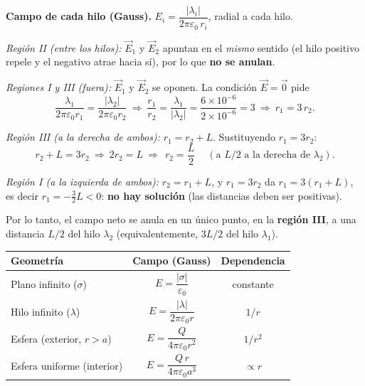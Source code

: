 \documentclass[12pt,letterpaper]{article}
\newcommand{\secgap}{\vspace{0.55cm}}
\begin{document}
\secgap

\noindent\textbf{Campo de cada hilo (Gauss).} $E_i=\dfrac{|\lambda_i|}{2\pi\varepsilon_0\,r_i}$, radial a cada hilo.

\smallskip
\noindent\emph{Regi\'on II (entre los hilos):} $\vec E_1$ y $\vec E_2$ apuntan en el \emph{mismo} sentido
(el hilo positivo repele y el negativo atrae hacia s\'i), por lo que \textbf{no se anulan}.

\smallskip
\noindent\emph{Regiones I y III (fuera):} $\vec E_1$ y $\vec E_2$ se oponen. La condici\'on $\vec E=\vec 0$ pide
\[
    \frac{\lambda_1}{2\pi\varepsilon_0 r_1}=\frac{|\lambda_2|}{2\pi\varepsilon_0 r_2}
    \ \Longrightarrow\
    \frac{r_1}{r_2}=\frac{\lambda_1}{|\lambda_2|}=\frac{6\times10^{-6}}{2\times10^{-6}}=3
    \ \Longrightarrow\
    r_1=3\,r_2.
\]

\smallskip
\noindent\emph{Regi\'on III (a la derecha de ambos):} $r_1=r_2+L$. Sustituyendo $r_1=3r_2$:
\[
    r_2+L=3r_2\ \Longrightarrow\ 2r_2=L\ \Longrightarrow\
    \boxed{\ r_2=\frac{L}{2}\ }\quad(\text{a }L/2\text{ a la derecha de }\lambda_2).
\]

\smallskip
\noindent\emph{Regi\'on I (a la izquierda de ambos):} $r_2=r_1+L$, y $r_1=3r_2$ da $r_1=3(r_1+L)$,
es decir $r_1=-\tfrac{3}{2}L<0$: \textbf{no hay soluci\'on} (las distancias deben ser positivas).

\smallskip
\noindent Por lo tanto, el campo neto se anula en un \'unico punto, en la \textbf{regi\'on III}, a una
distancia $L/2$ del hilo $\lambda_2$ (equivalentemente, $3L/2$ del hilo $\lambda_1$).

\secgap

\begin{center}
\renewcommand{\arraystretch}{1.5}
\begin{tabular}{|l|c|c|}
\hline
\textbf{Geometr\'ia} & \textbf{Campo (Gauss)} & \textbf{Dependencia} \\ \hline
Plano infinito ($\sigma$) & $E=\dfrac{|\sigma|}{\varepsilon_0}$ & constante \\ \hline
Hilo infinito ($\lambda$) & $E=\dfrac{|\lambda|}{2\pi\varepsilon_0 r}$ & $1/r$ \\ \hline
Esfera (exterior, $r>a$) & $E=\dfrac{Q}{4\pi\varepsilon_0 r^{2}}$ & $1/r^{2}$ \\ \hline
Esfera uniforme (interior) & $E=\dfrac{Q\,r}{4\pi\varepsilon_0 a^{3}}$ & $\propto r$ \\ \hline
\end{tabular}
\end{center}
\end{document}
